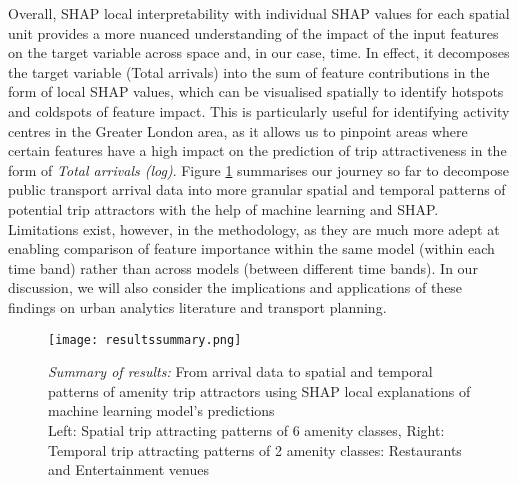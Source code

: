 Overall, SHAP local interpretability with individual SHAP values for each spatial unit provides a more nuanced understanding of the impact of the input features on the target variable across space and, in our case, time. In effect, it decomposes the target variable (Total arrivals) into the sum of feature contributions in the form of local SHAP values, which can be visualised spatially to identify hotspots and coldspots of feature impact. This is particularly useful for identifying activity centres in the Greater London area, as it allows us to pinpoint areas where certain features have a high impact on the prediction of trip attractiveness in the form of \textit{Total arrivals (log)}. Figure \ref{fig:resultssummary} summarises our journey so far to decompose public transport arrival data into more granular spatial and temporal patterns of potential trip attractors with the help of machine learning and SHAP. Limitations exist, however, in the methodology, as they are much more adept at enabling comparison of feature importance within the same model (within each time band) rather than across models (between different time bands). In our discussion, we will also consider the implications and applications of these findings on urban analytics literature and transport planning.

\begin{figure}[!htb]
    \centering
    \texttt{[image: resultssummary.png]}
    \captionsetup{justification=centering}
    \caption{\textit{Summary of results:} From arrival data to spatial and temporal patterns of amenity trip attractors using SHAP local explanations of machine learning model's predictions\\Left: Spatial trip attracting patterns of 6 amenity classes, Right: Temporal trip attracting patterns of 2 amenity classes: Restaurants and Entertainment venues}
    \label{fig:resultssummary}
\end{figure}